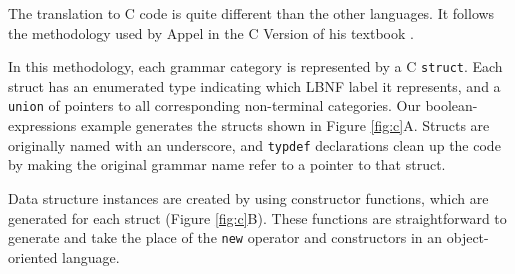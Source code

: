 
The translation to C code is quite different than the other languages. It follows the methodology used by Appel in the C Version of his textbook \cite{AppelC}.

In this methodology, each grammar category is represented by a C \texttt{struct}. Each struct has an enumerated type indicating which LBNF label it represents, and a \texttt{union} of pointers to all corresponding non-terminal categories. Our boolean-expressions example generates the structs shown in Figure \ref{fig:c}A. Structs are originally named with an underscore, and \texttt{typdef} declarations clean up the code by making the original grammar name refer to a pointer to that struct.

Data structure instances are created by using constructor functions, which are generated for each struct (Figure \ref{fig:c}B). These functions are straightforward to generate and take the place of the \texttt{new} operator and constructors in an object-oriented language.

